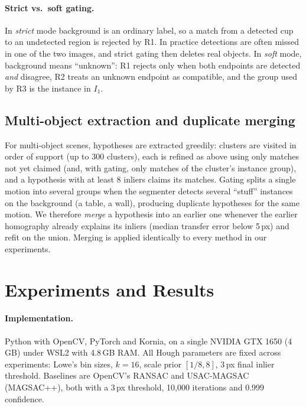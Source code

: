 \documentclass{article}
\begin{document}
\paragraph{Strict vs.\ soft gating.} In \emph{strict} mode background is an
ordinary label, so a match from a detected cup to an undetected region is
rejected by R1. In practice detections are often missed in one of the two
images, and strict gating then deletes real objects. In \emph{soft} mode,
background means ``unknown'': R1 rejects only when both endpoints are detected
\emph{and} disagree, R2 treats an unknown endpoint as compatible, and the
group used by R3 is the instance in $I_1$.

\subsection{Multi-object extraction and duplicate merging}
For multi-object scenes, hypotheses are extracted greedily: clusters are
visited in order of support (up to 300 clusters), each is refined as above
using only matches not yet claimed (and, with gating, only matches of the
cluster's instance group), and a hypothesis with at least 8 inliers claims
its matches. Gating splits a single motion into several groups when the
segmenter detects several ``stuff'' instances on the background (a table, a
wall), producing duplicate hypotheses for the same motion. We therefore
\emph{merge} a hypothesis into an earlier one whenever the earlier homography
already explains its inliers (median transfer error below 5\,px) and refit on
the union. Merging is applied identically to every method in our experiments.

\section{Experiments and Results}

\paragraph{Implementation.} Python with OpenCV, PyTorch and Kornia, on a
single NVIDIA GTX 1650 (4\,GB) under WSL2 with 4.8\,GB RAM. All Hough
parameters are fixed across experiments: Lowe's bin sizes, $k=16$, scale
prior $[1/8, 8]$, 3\,px final inlier threshold. Baselines are OpenCV's RANSAC
and USAC-MAGSAC (MAGSAC++), both with a 3\,px threshold, 10{,}000 iterations
and 0.999 confidence.
\end{document}
